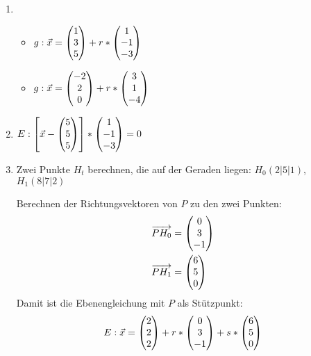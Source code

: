 \begin{lsg}{}
	\begin{enumerate}
		\item
		\begin{itemize}
			\item $g:\vec x=\begin{pmatrix} 1\\3\\5 \end{pmatrix}+r*\begin{pmatrix} 1\\-1\\-3 \end{pmatrix}$
			\item $g:\vec x=\begin{pmatrix} -2\\2\\0 \end{pmatrix}+r*\begin{pmatrix} 3\\1\\-4 \end{pmatrix}$
		\end{itemize}
		\item $E: \left[\vec x-\begin{pmatrix} 5\\5\\5 \end{pmatrix}\right]*\begin{pmatrix} 1\\-1\\-3 \end{pmatrix}=0$
		\item Zwei Punkte $H_t$ berechnen, die auf der Geraden liegen: $H_0(2|5|1)$, $H_1(8|7|2)$

		Berechnen der Richtungsvektoren von $P$ zu den zwei Punkten:
		\begin{align*}
			\overrightarrow{PH_0}&=\begin{pmatrix} 0\\3\\-1 \end{pmatrix}\\
			\overrightarrow{PH_1}&=\begin{pmatrix} 6\\5\\0 \end{pmatrix}
		\end{align*}
		Damit ist die Ebenengleichung mit $P$ als Stützpunkt:
		\begin{equation*}
			E:\vec x=\begin{pmatrix} 2\\2\\2 \end{pmatrix}+r*\begin{pmatrix} 0\\3\\-1 \end{pmatrix}+s*\begin{pmatrix} 6\\5\\0 \end{pmatrix}
		\end{equation*}
	\end{enumerate}
\end{lsg}


